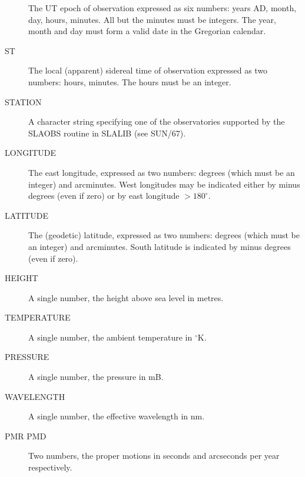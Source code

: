 \documentclass[twoside,11pt]{article}
\newcommand{\xref}[3]{#1}
\newcommand{\xlabel}[1]{}
\renewcommand{\_}{\texttt{\symbol{95}}}
\begin{document}
\begin{description}
The UT epoch of observation expressed as six numbers: years AD, month,
day, hours, minutes.  All but the minutes must be integers.  The year,
month and day must form a valid date in the Gregorian calendar.

\goodbreak
\item[\xlabel{ST}ST]\mbox{}

The local (apparent) sidereal time of observation expressed as two
numbers: hours, minutes.  The hours must be an integer.

\goodbreak
\item[\xlabel{STATION}STATION]\mbox{}

A character string specifying one of the observatories supported by
the \xref{SLA\_OBS}{sun67}{SLA_OBS} routine in \xref{SLALIB}{sun67}{}
(see SUN/67).

\goodbreak
\item[\xlabel{LONGITUDE}LONGITUDE]\mbox{}

The east longitude, expressed as two numbers: degrees (which must be an
integer) and arcminutes.  West longitudes may be indicated either by
minus degrees (even if zero) or by east longitude $> 180^\circ$.

\goodbreak
\item[\xlabel{LATITUDE}LATITUDE]\mbox{}

The (geodetic) latitude, expressed as two numbers: degrees (which must
be an integer) and arcminutes.  South latitude is indicated by minus
degrees (even if zero).

\goodbreak
\item[\xlabel{HEIGHT}HEIGHT]\mbox{}

 A single number, the height above sea level in metres.

\goodbreak
\item[\xlabel{TEMPERATURE}TEMPERATURE]\mbox{}

A single number, the ambient temperature in $^\circ$K.

\goodbreak
\item[\xlabel{PRESSURE}PRESSURE]\mbox{}

A single number, the pressure in mB.

\goodbreak
\item[\xlabel{WAVELENGTH}WAVELENGTH]\mbox{}

A single number, the effective wavelength in nm.

\goodbreak
\item[\xlabel{PMR_PMD}PMR PMD]\mbox{}

Two numbers, the proper motions in seconds and arcseconds per year
respectively.


\end{description}
\end{document}
